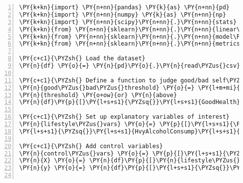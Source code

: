 \documentclass[12pt]{article}
\begin{document}
\begin{Verbatim}[commandchars=\\\{\},numbers=left,firstnumber=1,stepnumber=1,formatcom=\footnotesize]
\PY{k+kn}{import} \PY{n+nn}{pandas} \PY{k}{as} \PY{n+nn}{pd}
\PY{k+kn}{import} \PY{n+nn}{numpy} \PY{k}{as} \PY{n+nn}{np}
\PY{k+kn}{import} \PY{n+nn}{scipy}\PY{n+nn}{.}\PY{n+nn}{stats} \PY{k}{as} \PY{n+nn}{stats}
\PY{k+kn}{from} \PY{n+nn}{sklearn}\PY{n+nn}{.}\PY{n+nn}{linear\PYZus{}model} \PY{k+kn}{import} \PY{n}{LogisticRegression}
\PY{k+kn}{from} \PY{n+nn}{sklearn}\PY{n+nn}{.}\PY{n+nn}{model\PYZus{}selection} \PY{k+kn}{import} \PY{n}{StratifiedKFold}
\PY{k+kn}{from} \PY{n+nn}{sklearn}\PY{n+nn}{.}\PY{n+nn}{metrics} \PY{k+kn}{import} \PY{n}{classification\PYZus{}report}

\PY{c+c1}{\PYZsh{} Load the dataset}
\PY{n}{df} \PY{o}{=} \PY{n}{pd}\PY{o}{.}\PY{n}{read\PYZus{}csv}\PY{p}{(}\PY{l+s+s1}{\PYZsq{}}\PY{l+s+s1}{diabetes\PYZus{}binary\PYZus{}health\PYZus{}indicators\PYZus{}BRFSS2015.csv}\PY{l+s+s1}{\PYZsq{}}\PY{p}{)}

\PY{c+c1}{\PYZsh{} Define a function to judge good/bad self\PYZhy{}reported health status}
\PY{n}{good\PYZus{}bad\PYZus{}threshold} \PY{o}{=} \PY{l+m+mi}{3}  \PY{c+c1}{\PYZsh{} \PYZsq{}Good\PYZsq{} = less than threshold, \PYZsq{}Bad\PYZsq{} = \PYZbs{}}
\PY{n}{threshold} \PY{o+ow}{or} \PY{n}{above}
\PY{n}{df}\PY{p}{[}\PY{l+s+s1}{\PYZsq{}}\PY{l+s+s1}{GoodHealth}\PY{l+s+s1}{\PYZsq{}}\PY{p}{]} \PY{o}{=} \PY{n}{np}\PY{o}{.}\PY{n}{where}\PY{p}{(}\PY{n}{df}\PY{p}{[}\PY{l+s+s1}{\PYZsq{}}\PY{l+s+s1}{GenHlth}\PY{l+s+s1}{\PYZsq{}}\PY{p}{]} \PY{o}{\PYZlt{}} \PY{n}{good\PYZus{}bad\PYZus{}threshold}\PY{p}{,} \PY{l+m+mi}{1}\PY{p}{,} \PY{l+m+mi}{0}\PY{p}{)}

\PY{c+c1}{\PYZsh{} Set up explanatory variables of interest}
\PY{n}{lifestyle\PYZus{}vars} \PY{o}{=} \PY{p}{[}\PY{l+s+s1}{\PYZsq{}}\PY{l+s+s1}{PhysActivity}\PY{l+s+s1}{\PYZsq{}}\PY{p}{,} \PY{l+s+s1}{\PYZsq{}}\PY{l+s+s1}{Fruits}\PY{l+s+s1}{\PYZsq{}}\PY{p}{,} \PY{l+s+s1}{\PYZsq{}}\PY{l+s+s1}{Veggies}\PY{l+s+s1}{\PYZsq{}}\PY{p}{,} \PYZbs{}
\PY{l+s+s1}{\PYZsq{}}\PY{l+s+s1}{HvyAlcoholConsump}\PY{l+s+s1}{\PYZsq{}}\PY{p}{,} \PY{l+s+s1}{\PYZsq{}}\PY{l+s+s1}{Smoker}\PY{l+s+s1}{\PYZsq{}}\PY{p}{]}

\PY{c+c1}{\PYZsh{} Add control variables}
\PY{n}{control\PYZus{}vars} \PY{o}{=} \PY{p}{[}\PY{l+s+s1}{\PYZsq{}}\PY{l+s+s1}{Age}\PY{l+s+s1}{\PYZsq{}}\PY{p}{,} \PY{l+s+s1}{\PYZsq{}}\PY{l+s+s1}{Sex}\PY{l+s+s1}{\PYZsq{}}\PY{p}{,} \PY{l+s+s1}{\PYZsq{}}\PY{l+s+s1}{Education}\PY{l+s+s1}{\PYZsq{}}\PY{p}{,} \PY{l+s+s1}{\PYZsq{}}\PY{l+s+s1}{Income}\PY{l+s+s1}{\PYZsq{}}\PY{p}{]}
\PY{n}{X} \PY{o}{=} \PY{n}{df}\PY{p}{[}\PY{n}{lifestyle\PYZus{}vars} \PY{o}{+} \PY{n}{control\PYZus{}vars}\PY{p}{]}\PY{o}{.}\PY{n}{values}
\PY{n}{y} \PY{o}{=} \PY{n}{df}\PY{p}{[}\PY{l+s+s1}{\PYZsq{}}\PY{l+s+s1}{GoodHealth}\PY{l+s+s1}{\PYZsq{}}\PY{p}{]}\PY{o}{.}\PY{n}{values}


\end{Verbatim}
\end{document}
